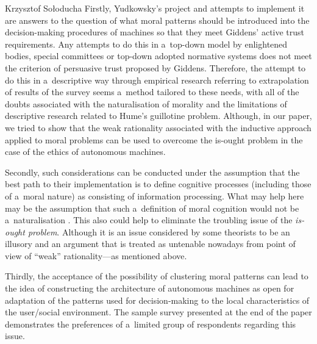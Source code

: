 \begin{artengenv}{Krzysztof Sołoducha}
Firstly, Yudkowsky's project and attempts to implement it are answers to the question of what moral patterns should be introduced into the decision-making procedures of machines so that they meet Giddens' active trust requirements. Any attempts to do this in a~top-down model by enlightened bodies, special committees or top-down adopted normative systems does not meet the criterion of persuasive trust proposed by Giddens. Therefore, the attempt to do this in a~descriptive way through empirical research referring to extrapolation of results of the survey seems a~method tailored to these needs, with all of the doubts associated with the naturalisation of morality and the limitations of descriptive research related to Hume's guillotine problem. Although, in our paper, we tried to show that the weak rationality associated with the inductive approach applied to moral problems can be used to overcome the is-ought problem in the case of the ethics of autonomous machines.

Secondly, such considerations can be conducted under the assumption that the best path to their implementation is to define cognitive processes (including those of a~moral nature) as consisting of information processing. What may help here may be the assumption that such a~definition of moral cognition would not be a~naturalisation
\parencite[][]{peruzzi_beginners_2015}. %
 This also could help to eliminate the troubling issue of the \textit{is-ought problem}. Although it is an issue considered by some theorists to be an illusory 
\parencite[][]{gellner_words_2005} %
 and an argument that is treated as untenable nowadays 
\parencite[][]{searle_how_1964} %
 from point of view of ``weak'' rationality—as mentioned above.

Thirdly, the acceptance of the possibility of clustering moral patterns can lead to the idea of constructing the architecture of autonomous machines as open for adaptation of the patterns used for decision-making to the local characteristics of the user/social environment. The sample survey presented at the end of the paper demonstrates the preferences of a~limited group of respondents regarding this issue.


\end{artengenv}
